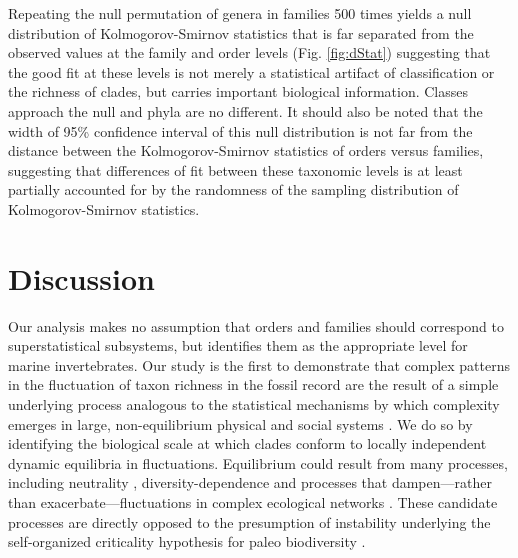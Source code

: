 \documentclass[12pt]{article}
\let\citep=\cite
\begin{document}
Repeating the null permutation of genera in families 500 times yields
a null distribution of Kolmogorov-Smirnov statistics that is far
separated from the observed values at the family and order levels
(Fig. \ref{fig:dStat}) suggesting that the good fit at these levels is
not merely a statistical artifact of classification or the richness of
clades, but carries important biological information. Classes approach
the null and phyla are no different. It should also be noted that the
width of 95\% confidence interval of this null distribution is not far
from the distance between the Kolmogorov-Smirnov statistics of orders
versus families, suggesting that differences of fit between these
taxonomic levels is at least partially accounted for by the randomness
of the sampling distribution of Kolmogorov-Smirnov statistics.

\section{Discussion}

Our analysis makes no assumption that orders and families should
correspond to superstatistical subsystems, but identifies them as the
appropriate level for marine invertebrates. Our study is the first to
demonstrate that complex patterns in the fluctuation of taxon richness
in the fossil record are the result of a simple underlying process
analogous to the statistical mechanisms by which complexity emerges in
large, non-equilibrium physical \citep{beck2004} and social systems
\citep{fuentes2009}.  We do so by identifying the biological scale at
which clades conform to locally independent dynamic equilibria in
fluctuations.  Equilibrium could result from many processes, including
neutrality \citep{macWilson, hubbell2001}, diversity-dependence
\citep{moen2014, foote2018} and processes that dampen---rather than
exacerbate---fluctuations in complex ecological networks
\citep{berlow2009}. These candidate processes are directly opposed to
the presumption of instability underlying the self-organized
criticality hypothesis for paleo biodiversity \citep{bak1993,
  sole1997}.
\end{document}
